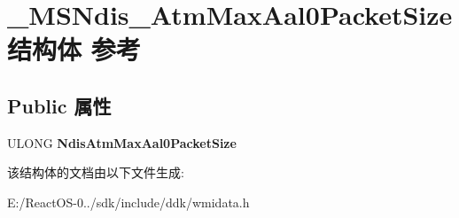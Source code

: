 \hypertarget{struct___m_s_ndis___atm_max_aal0_packet_size}{}\section{\+\_\+\+M\+S\+Ndis\+\_\+\+Atm\+Max\+Aal0\+Packet\+Size结构体 参考}
\label{struct___m_s_ndis___atm_max_aal0_packet_size}
\subsection*{Public 属性}
\begin{DoxyCompactItemize}
\item 
\mbox{\label{struct___m_s_ndis___atm_max_aal0_packet_size_a6859312852a81d0378360a27bf2dba6f}} 
U\+L\+O\+NG {\bfseries Ndis\+Atm\+Max\+Aal0\+Packet\+Size}
\end{DoxyCompactItemize}


该结构体的文档由以下文件生成\+:\begin{DoxyCompactItemize}
\item 
E\+:/\+React\+O\+S-\/0../sdk/include/ddk/wmidata.\+h\end{DoxyCompactItemize}
